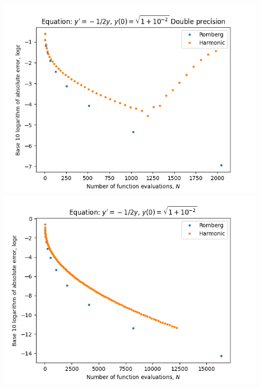 \begin{figure}[H]
\centering
\begin{minipage}{0.45\textwidth}
\centering
\includegraphics[scale=0.45]{../results/emr_plots/quad_sing_2.png}
\end{minipage}
\begin{minipage}{0.45\textwidth}
\centering
\includegraphics[scale=0.45]{../results/emr_plots/quad_sing_2_hp.png}
\end{minipage}
\end{figure}

